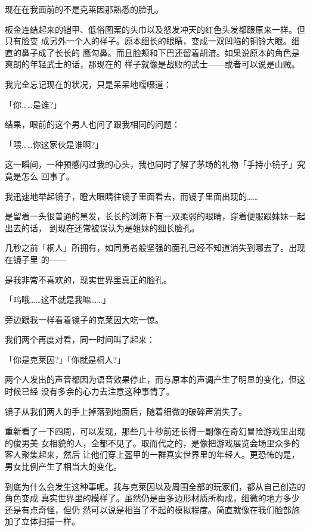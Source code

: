 \documentclass[11pt]{book}
\begin{document}
现在在我面前的不是克莱因那熟悉的脸孔。

板金连结起来的铠甲、低俗图案的头巾以及怒发冲天的红色头发都跟原来一样。但只有脸变
成另外一个人的样子。原本细长的眼睛，变成一双凹陷的铜铃大眼。细直的鼻子成了长长的
鹰勾鼻。而且脸颊和下巴还留着胡渣。如果说原本的角色是爽朗的年轻武士的话，那现在的
样子就像是战败的武士——或者可以说是山贼。

我完全忘记现在的状况，只是呆呆地嚅嗫道：

「你……是谁?」

结果，眼前的这个男人也问了跟我相同的问题：

「喂……你这家伙是谁啊?」

这一瞬间，一种预感闪过我的心头，我也同时了解了茅场的礼物「手持小镜子」究竟是怎么
回事了。

我迅速地举起镜子，瞪大眼睛往镜子里面看去，而镜子里面出现的……

是留着一头很普通的黑发，长长的浏海下有一双柔弱的眼睛，穿着便服跟妹妹一起出去的话，
到现在还常被误认为是姐妹的细长脸孔。

几秒之前「桐人」所拥有，如同勇者般坚强的面孔已经不知道消失到哪去了。出现在镜子里
的——

是我非常不喜欢的，现实世界里真正的脸孔。

「呜哦……这不就是我嘛……」

旁边跟我一样看着镜子的克莱因大吃一惊。

我们两个再度对看，同一时间叫了起来：

「你是克莱因?」「你就是桐人?」

两个人发出的声音都因为语音效果停止，而与原本的声调产生了明显的变化，但这时候已经
没有多余的心力去注意这种事情了。




















镜子从我们两人的手上掉落到地面后，随着细微的破碎声消失了。

重新看了一下四周，可以发现，那些几十秒前还长得一副像在奇幻冒险游戏里出现的俊男美
女相貌的人，全都不见了。取而代之的，是像把游戏展览会场里众多的客人聚集起来，然后
让他们穿上盔甲的一群真实世界里的年轻人。更恐怖的是，男女比例产生了相当大的变化。

到底为什么会发生这种事呢。我与克莱因以及周围全部的玩家们，都从自己创造的角色变成
真实世界里的模样了。虽然仍是由多边形材质所构成，细微的地方多少还是有点奇怪，但仍
然可以说是相当了不起的模拟程度。简直就像在我们脸部施加了立体扫描一样。
\end{document}
